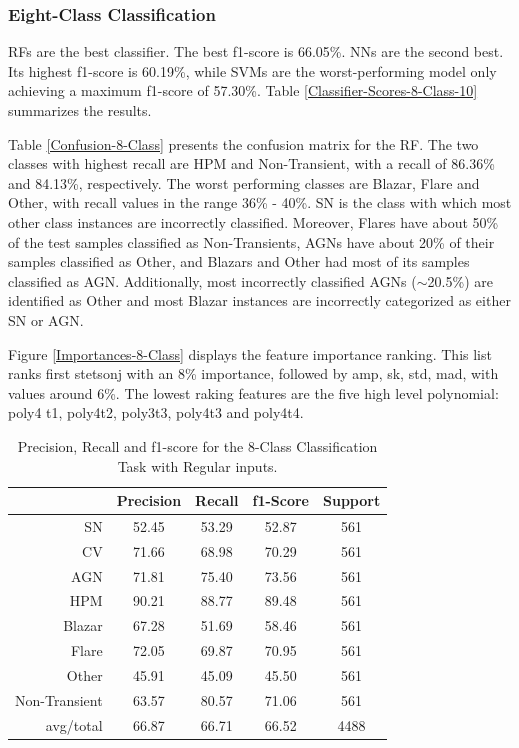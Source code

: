 \documentclass[a4paper,fleqn,usenatbib]{mnras}
\begin{document}
\subsubsection{Eight-Class Classification}


RFs are the best classifier. 
The best f1-score is 66.05\%. 
NNs are the second best. 
Its highest f1-score is 60.19\%, while SVMs are the worst-performing
model only achieving a maximum f1-score of 57.30\%.
Table \ref{Classifier-Scores-8-Class-10} summarizes the results. 


Table \ref{Confusion-8-Class} presents the confusion matrix for the RF.
The two classes with highest recall are HPM and Non-Transient, with a
recall of 86.36\% and 84.13\%, respectively. 
The worst performing classes are Blazar, Flare and Other, with recall
values in the range 36\% - 40\%. 
SN is the class with which most other class instances are
incorrectly classified. 
Moreover, Flares have about 50\% of the test samples classified as
Non-Transients, AGNs have about 20\% of their 
samples classified as Other, and Blazars and Other had most of  its
samples classified as AGN. 
Additionally, most incorrectly classified AGNs ($\sim$20.5\%) are
identified as Other and most Blazar instances are
incorrectly categorized as either SN or AGN. 


Figure \ref{Importances-8-Class} displays the feature importance ranking.
This list ranks first stetson\textunderscore j with an 8\% importance,
followed by amp, sk, std, mad, with values around 6\%. 
The lowest raking features are the five high level polynomial: poly4\textunderscore
t1,  poly4\textunderscore t2, poly3\textunderscore t3,
poly4\textunderscore t3 and poly4\textunderscore t4. 


\begin{table}
\centering
\begin{tabular}{|r|c|c|c|c|}
\hline
\multicolumn{1}{|l|}{} & Precision & Recall & f1-Score & Support \\ \hline \hline
SN &52.45& 53.29& 52.87 & 561 \\ \hline
CV &71.66& 68.98& 70.29 & 561 \\ \hline
AGN &71.81& 75.40& 73.56 & 561 \\ \hline
HPM &90.21& 88.77& 89.48 & 561 \\ \hline
Blazar &67.28& 51.69& 58.46 & 561 \\ \hline
Flare &72.05& 69.87& 70.95 & 561 \\ \hline
Other &45.91& 45.09& 45.50 & 561 \\ \hline
Non-Transient &63.57& 80.57& 71.06 & 561 \\ \hline
avg/total & 66.87 & 66.71 & 66.52 & 4488 \\ \hline
\end{tabular}
\caption{Precision, Recall and f1-score for the 8-Class Classification Task with Regular inputs.}
\label{Overall-Scores-8-Class-Regular}
\end{table}
\end{document}
